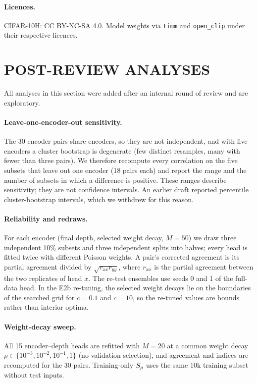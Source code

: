 \paragraph{Licences.} CIFAR-10H: CC BY-NC-SA 4.0. Model weights via \texttt{timm} and \texttt{open\_clip} under their respective licences.

\section{POST-REVIEW ANALYSES}
\label{app:revision}
All analyses in this section were added after an internal round of review and are exploratory.
\paragraph{Leave-one-encoder-out sensitivity.} The 30 encoder pairs share encoders, so they are not independent, and with five encoders a cluster bootstrap is degenerate (few distinct resamples, many with fewer than three pairs). We therefore recompute every correlation on the five subsets that leave out one encoder (18 pairs each) and report the range and the number of subsets in which a difference is positive. These ranges describe sensitivity; they are not confidence intervals. An earlier draft reported percentile cluster-bootstrap intervals, which we withdrew for this reason.
\paragraph{Reliability and redraws.} For each encoder (final depth, selected weight decay, $M=50$) we draw three independent 10\% subsets and three independent splits into halves; every head is fitted twice with different Poisson weights. A pair's corrected agreement is its partial agreement divided by $\sqrt{r_{xx}r_{yy}}$, where $r_{xx}$ is the partial agreement between the two replicates of head $x$. The re-test ensembles use seeds 0 and 1 of the full-data head. In the E2b re-tuning, the selected weight decays lie on the boundaries of the searched grid for $c=0.1$ and $c=10$, so the re-tuned values are bounds rather than interior optima.
\paragraph{Weight-decay sweep.} All 15 encoder--depth heads are refitted with $M=20$ at a common weight decay $\rho\in\{10^{-3},10^{-2},10^{-1},1\}$ (no validation selection), and agreement and indices are recomputed for the 30 pairs. Training-only $S_{\rho}$ uses the same 10k training subset without test inputs.

